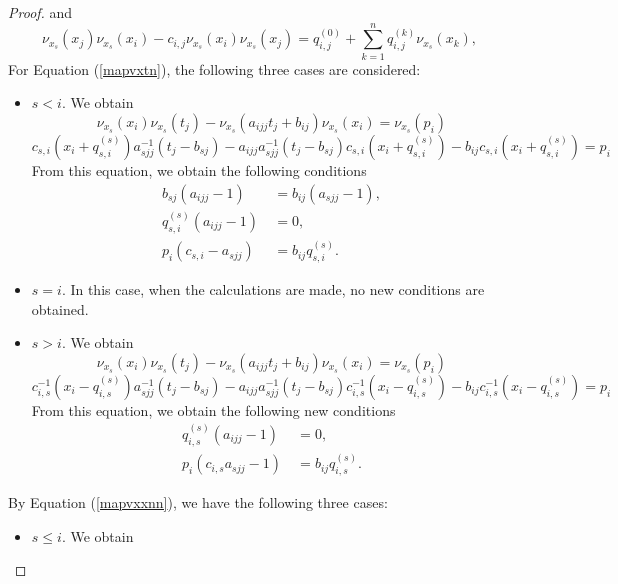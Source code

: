 \documentclass{amsart}
\theoremstyle{definition}
\theoremstyle{remark}
\numberwithin{equation}{section}
\begin{document}
\begin{proof}
and
\begin{equation}\label{mapvxxnn}
\nu_{x_s}(x_j)\nu_{x_s}(x_i)-c_{i,j}\nu_{x_s}(x_i)\nu_{x_s}(x_j) = q_{i,j}^{(0)}+\sum_{k=1}^{n}q_{i,j}^{(k)}\nu_{x_s}(x_k), 
\end{equation}
For Equation {\rm (}\ref{mapvxtn}{\rm )}, the following three cases are considered:
\begin{itemize}
    \item $s<i$. We obtain 
    \begin{equation*}
        \nu_{x_s}(x_i)\nu_{x_s}(t_j)-\nu_{x_s}(a_{ijj}t_j+b_{ij})\nu_{x_s}(x_i) = \nu_{x_s}(p_i)
    \end{equation*}
    \begin{equation*}
        c_{s,i}(x_i+q_{s,i}^{(s)})a_{sjj}^{-1}(t_j-b_{sj})-a_{ijj}a_{sjj}^{-1}(t_j-b_{sj})c_{s,i}(x_i+q_{s,i}^{(s)})-b_{ij}c_{s,i}(x_i+q_{s,i}^{(s)})=p_i
    \end{equation*}
    From this equation, we obtain the following conditions
    \begin{align*}
        b_{sj}(a_{ijj}-1) &\ =b_{ij}(a_{sjj}-1), \\
        q_{s,i}^{(s)}(a_{ijj}-1) &\ =0, \\
        p_i(c_{s,i}-a_{sjj}) &\ =b_{ij}q_{s,i}^{(s)}.
    \end{align*}
    \item $s=i$. In this case, when the calculations are made, no new conditions are obtained.
    \item $s>i$. We obtain 
    \begin{equation*}
        \nu_{x_s}(x_i)\nu_{x_s}(t_j)-\nu_{x_s}(a_{ijj}t_j+b_{ij})\nu_{x_s}(x_i) = \nu_{x_s}(p_i)
    \end{equation*}
    \begin{equation*}
        c_{i,s}^{-1}(x_i-q_{i,s}^{(s)})a_{sjj}^{-1}(t_j-b_{sj})-a_{ijj}a_{sjj}^{-1}(t_j-b_{sj})c_{i,s}^{-1}(x_i-q_{i,s}^{(s)})-b_{ij}c_{i,s}^{-1}(x_i-q_{i,s}^{(s)})=p_i
    \end{equation*}
    From this equation, we obtain the following new conditions
    \begin{align*}
        q_{i,s}^{(s)}(a_{ijj}-1) &\ =0, \\
        p_i(c_{i,s}a_{sjj}-1) &\ =b_{ij}q_{i,s}^{(s)}.
    \end{align*}
\end{itemize}
By Equation {\rm (}\ref{mapvxxnn}{\rm )}, we have the following three cases:
\begin{itemize}
    \item $s\leq i$. We obtain

\end{itemize}
\end{proof}
\end{document}
